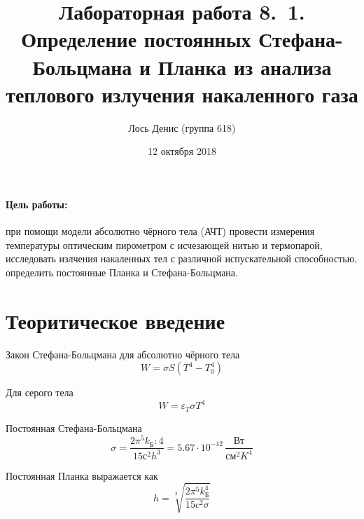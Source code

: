 \documentclass[12pt]{article}
\title{{\bf Лабораторная работа 8.\, 1. \\ Определение постоянных Стефана-Больцмана и Планка из анализа теплового излучения накаленного газа}}
\author{Лось Денис (группа 618)}
\date{12 октября 2018}
\begin{document}
\maketitle

\paragraph{Цель работы: } при помощи модели абсолютно чёрного тела (АЧТ) провести измерения температуры оптическим пирометром с исчезающей нитью и термопарой, исследовать излчения накаленных тел с различной испускательной способностью, определить постоянные Планка и Стефана-Больцмана.

\section*{Теоритическое введение}
\par
	Закон Стефана-Больцмана для абсолютно чёрного тела
\[
	W = \sigma S \left(T^4 - T_0^4 \right)
\]
\par
	Для серого тела
\[
	W = \varepsilon_T \sigma T^4
\]
\par
	Постоянная Стефана-Больцмана
\[
	\sigma = \frac{2 \pi^5 k_\text{Б}:4}{15 с^2 h^3} = 5.67 \cdot 10^{-12} \, \frac{\text{Вт}}{\text{см}^2 K^4}
\]
\par
	Постоянная Планка выражается как
\[
	h = \sqrt[3]{\frac{2 \pi^5 k_\text{Б}^4}{15 c^2 \sigma}}
\]
\end{document}
